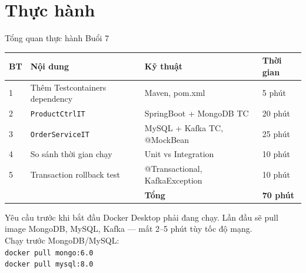 \documentclass[aspectratio=169,10pt]{beamer}
\begin{document}
\section{Thực hành}

\begin{frame}{Tổng quan thực hành Buổi 7}
  \begin{center}
  \small
  \begin{tabular}{p{0.5cm}p{3.5cm}p{5cm}p{1.8cm}}
    \toprule
    \textbf{BT} & \textbf{Nội dung} & \textbf{Kỹ thuật} & \textbf{Thời gian} \\
    \midrule
    1 & Thêm Testcontainers dependency & Maven, pom.xml & 5 phút \\
    2 & \texttt{ProductCtrlIT} & SpringBoot + MongoDB TC & 20 phút \\
    3 & \texttt{OrderServiceIT} & MySQL + Kafka TC, @MockBean & 25 phút \\
    4 & So sánh thời gian chạy & Unit vs Integration & 10 phút \\
    5 & Transaction rollback test & @Transactional, KafkaException & 10 phút \\
    \midrule
    & & \textbf{Tổng} & \textbf{70 phút} \\
    \bottomrule
  \end{tabular}
  \end{center}

  \begin{alertblock}{Yêu cầu trước khi bắt đầu}
    Docker Desktop phải đang chạy. Lần đầu sẽ pull image MongoDB,
    MySQL, Kafka --- mất 2--5 phút tùy tốc độ mạng.\\
    Chạy trước MongoDB/MySQL:\\
    \texttt{docker pull mongo:6.0}\\[-0.2em]
    \texttt{docker pull mysql:8.0}
  \end{alertblock}
\end{frame}
\end{document}
